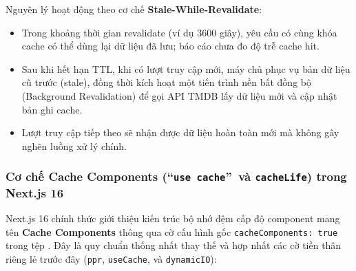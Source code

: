 \documentclass[12pt,a4paper]{extarticle}
\begin{document}
Nguyên lý hoạt động theo cơ chế \textbf{Stale-While-Revalidate}:
\begin{itemize}[noitemsep]
    \item Trong khoảng thời gian revalidate (ví dụ 3600 giây), yêu cầu có cùng khóa cache có thể dùng lại dữ liệu đã lưu; báo cáo chưa đo độ trễ cache hit.
    \item Sau khi hết hạn TTL, khi có lượt truy cập mới, máy chủ phục vụ bản dữ liệu cũ trước (stale), đồng thời kích hoạt một tiến trình nền bất đồng bộ (Background Revalidation) để gọi API TMDB lấy dữ liệu mới và cập nhật bản ghi cache.
    \item Lượt truy cập tiếp theo sẽ nhận được dữ liệu hoàn toàn mới mà không gây nghẽn luồng xử lý chính.
\end{itemize}

\subsubsection[Cơ chế Cache Components trong Next.js 16]{Cơ chế Cache Components (\textquotedblleft\texttt{use cache}\textquotedblright\ và \texttt{cacheLife}) trong Next.js 16}
Next.js 16 chính thức giới thiệu kiến trúc bộ nhớ đệm cấp độ component mang tên \textbf{Cache Components} thông qua cờ cấu hình gốc \texttt{cacheComponents: true} trong tệp . Đây là quy chuẩn thống nhất thay thế và hợp nhất các cờ tiền thân riêng lẻ trước đây (\texttt{ppr}, \texttt{useCache}, và \texttt{dynamicIO}):
\end{document}
